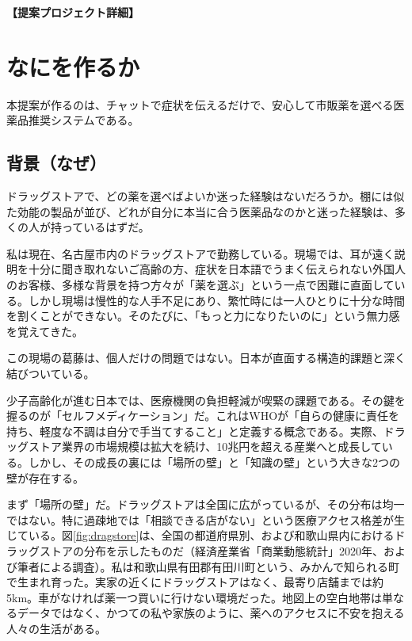 \documentclass[11pt,a4paper,ja=minimal,xelatex]{bxjsarticle}
\author{}
\date{}
\newcommand{\BodyBaselineSkip}{11pt}  %
\begin{document}
\setlength{\baselineskip}{\BodyBaselineSkip}
\setlength{\lineskip}{0.2em}

\begin{center}
\fontsize{14}{17}\selectfont\bfseries
【提案プロジェクト詳細】
\end{center}

\section*{ なにを作るか}

本提案が作るのは、チャットで症状を伝えるだけで、安心して市販薬を選べる医薬品推奨システムである。

\subsection*{背景（なぜ）}
ドラッグストアで、どの薬を選べばよいか迷った経験はないだろうか。棚には似た効能の製品が並び、どれが自分に本当に合う医薬品なのかと迷った経験は、多くの人が持っているはずだ。

私は現在、名古屋市内のドラッグストアで勤務している。現場では、耳が遠く説明を十分に聞き取れないご高齢の方、症状を日本語でうまく伝えられない外国人のお客様、多様な背景を持つ方々が「薬を選ぶ」という一点で困難に直面している。しかし現場は慢性的な人手不足にあり、繁忙時には一人ひとりに十分な時間を割くことができない。そのたびに、「もっと力になりたいのに」という無力感を覚えてきた。

この現場の葛藤は、個人だけの問題ではない。日本が直面する構造的課題と深く結びついている。

少子高齢化が進む日本では、医療機関の負担軽減が喫緊の課題である。その鍵を握るのが「セルフメディケーション」だ。これはWHOが「自らの健康に責任を持ち、軽度な不調は自分で手当てすること」と定義する概念である。実際、ドラッグストア業界の市場規模は拡大を続け、10兆円を超える産業へと成長している。しかし、その成長の裏には「場所の壁」と「知識の壁」という大きな2つの壁が存在する。

まず「場所の壁」だ。ドラッグストアは全国に広がっているが、その分布は均一ではない。特に過疎地では「相談できる店がない」という医療アクセス格差が生じている。図\ref{fig:dragstore}は、全国の都道府県別、および和歌山県内におけるドラッグストアの分布を示したものだ（経済産業省「商業動態統計」2020年、および筆者による調査）。私は和歌山県有田郡有田川町という、みかんで知られる町で生まれ育った。実家の近くにドラッグストアはなく、最寄り店舗までは約5km。車がなければ薬一つ買いに行けない環境だった。地図上の空白地帯は単なるデータではなく、かつての私や家族のように、薬へのアクセスに不安を抱える人々の生活がある。
\end{document}
